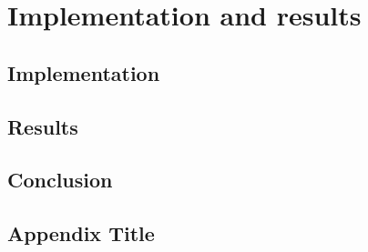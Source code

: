 \documentclass[12pt, twoside]{report}
\begin{document}
\part{Implementation and results}

\chapter{Implementation}


\chapter{Results}

 
\chapter{Conclusion}


\appendix
\chapter{Appendix Title}

\end{document}
